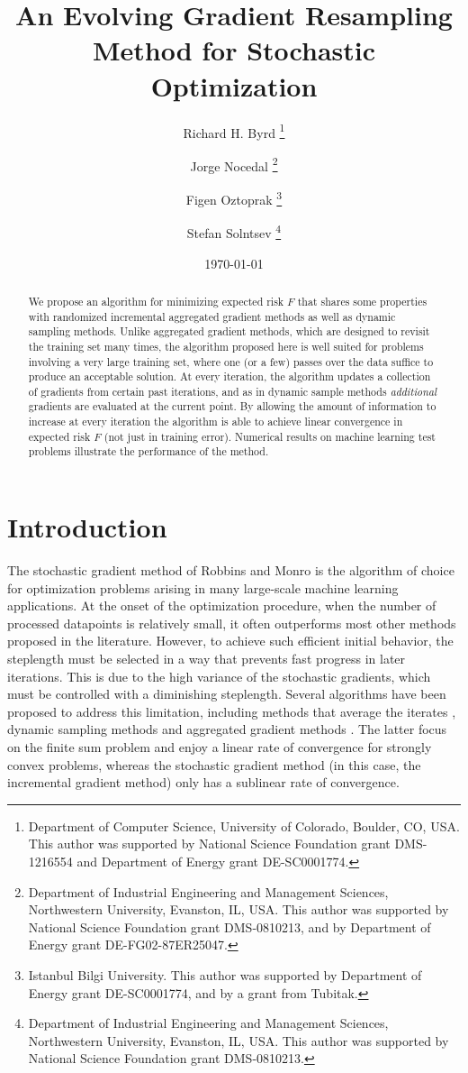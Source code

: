 \documentclass[11pt]{article}
\title{An Evolving Gradient Resampling Method for Stochastic Optimization}
\author{Richard H. Byrd 
\thanks{Department of Computer Science, University of Colorado, Boulder, CO, USA. This author was supported by National Science Foundation grant DMS-1216554 and Department of Energy grant DE-SC0001774.} 
\and Jorge Nocedal 
\thanks{Department of Industrial Engineering and Management Sciences, Northwestern University, Evanston, IL, USA. This author was supported by National Science Foundation grant DMS-0810213, and by Department of Energy grant DE-FG02-87ER25047.} 
\and Figen Oztoprak 
\thanks{Istanbul Bilgi University. This author was supported by Department of Energy grant DE-SC0001774, and by a grant from Tubitak.} 
\and Stefan Solntsev \thanks{Department of Industrial Engineering and Management Sciences, Northwestern University, Evanston, IL, USA. This author was supported by National Science Foundation grant DMS-0810213.} 
}
\date{\today}
\begin{document}
\maketitle 
\begin{abstract}
We propose an algorithm for minimizing expected risk $F$ that shares some properties with randomized  incremental aggregated gradient methods as well as  dynamic sampling methods. Unlike aggregated gradient methods, which are designed to revisit the training set many times, the algorithm proposed here is well suited for problems involving a very large training set,  where one (or a few) passes over the data suffice to produce an acceptable solution.  At every iteration, the algorithm updates  a collection of gradients  from certain past iterations, and as in dynamic sample methods \emph{additional} gradients are evaluated at the current point. By allowing the amount of information to increase at every iteration the algorithm is able to achieve  linear convergence in expected risk $F$ (not just in training error). Numerical results on machine learning test problems illustrate the performance of the method. 
\end{abstract}
 
%

\section{Introduction}

The stochastic gradient method of Robbins and Monro \cite{RobMon51} is the algorithm of choice for optimization problems arising in many large-scale machine learning applications.  At the onset of the optimization procedure, when the number of processed datapoints is relatively small, it often outperforms most other methods proposed in the literature. However, to achieve such efficient initial behavior,  the steplength must be selected in a way that prevents fast progress in later iterations. This is due to the high variance of the stochastic gradients, which must be controlled with a diminishing steplength. Several algorithms have been proposed to address this limitation, including methods that average the iterates \cite{PolJud92,ruppert1988efficient, Nesterov:09}, dynamic sampling methods \cite{dss,FS2011,2014pasglyetal} and aggregated gradient methods  \cite{roux2012stochastic,johnson2013accelerating,shalev2013stochastic,mairal2015incremental,defazio2014finito,frostig2014competing,NIPS2014_5258}.
The latter focus on the finite sum problem and enjoy a linear rate of convergence for strongly convex problems, whereas the stochastic gradient method (in this case, the incremental gradient method) only has a sublinear rate of convergence. 
\end{document}
